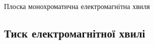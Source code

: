 \documentclass[onlytextwidth]{beamer}
\begin{document}
\begin{frame}{Плоска монохроматична електромагнітна хвиля}{}
	\begin{center}
		
	\end{center}
\end{frame}




\subsection{Тиск електромагнітної хвилі}
\end{document}
